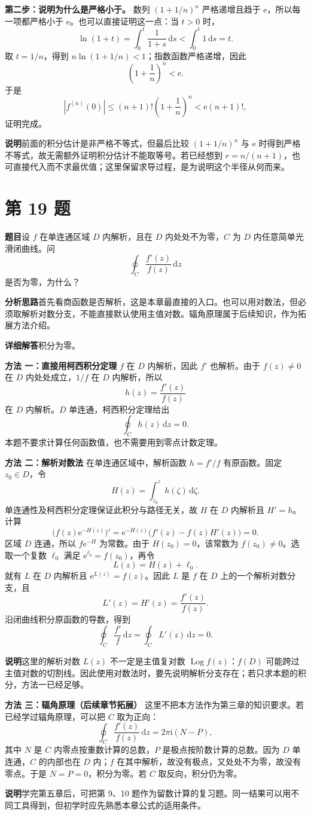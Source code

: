 \documentclass[UTF8,11pt,a4paper,fontset=fandol]{ctexart}
\newcommand{\ii}{\mathrm{i}}
\newcommand{\ee}{\mathrm{e}}
\newcommand{\dd}{\,\mathrm{d}}
\newcommand{\Log}{\operatorname{Log}}
\newcommand{\idea}{\par\medskip\Needspace{3\baselineskip}\noindent\textbf{分析思路}\quad}
\newcommand{\answer}{\par\medskip\Needspace{3\baselineskip}\noindent\textbf{详细解答}\quad}
\newcommand{\method}[1]{\par\medskip\Needspace{3\baselineskip}\noindent\textbf{方法 #1}\quad}
\newcommand{\note}{\par\medskip\Needspace{3\baselineskip}\noindent\textbf{说明}\quad}
\newcommand{\problem}[1]{\par\Needspace{8\baselineskip}\section*{第 #1 题}\addcontentsline{toc}{section}{第 #1 题}}
\begin{document}
\textbf{第二步：说明为什么是严格小于。}
数列 $(1+1/n)^n$ 严格递增且趋于 $\ee$，所以每一项都严格小于 $\ee$。也可以直接证明这一点：当 $t>0$ 时，
\[
\ln(1+t)=\int_0^t\frac1{1+s}\dd s<\int_0^t1\dd s=t.
\]
取 $t=1/n$，得到 $n\ln(1+1/n)<1$；指数函数严格递增，因此
\[
\left(1+\frac1n\right)^n<\ee.
\]
于是
\[
|f^{(n)}(0)|\leqslant(n+1)!\left(1+\frac1n\right)^n
<\ee(n+1)!,
\]
证明完成。
\note 前面的积分估计是非严格不等式，但最后比较 $(1+1/n)^n$ 与 $\ee$ 时得到严格不等式，故无需额外证明积分估计不能取等号。若已经想到 $r=n/(n+1)$，也可直接代入而不求最优值；这里保留求导过程，是为说明这个半径从何而来。

\problem{19}
\textbf{题目}\quad 设 $f$ 在单连通区域 $D$ 内解析，且在 $D$ 内处处不为零，$C$ 为 $D$ 内任意简单光滑闭曲线。问
\[
\oint_C\frac{f'(z)}{f(z)}\dd z
\]
是否为零，为什么？
\idea 首先看商函数是否解析，这是本章最直接的入口。也可以用对数法，但必须取解析对数分支，不能直接默认使用主值对数。辐角原理属于后续知识，作为拓展方法介绍。
\answer 积分为零。
\method{一：直接用柯西积分定理}
$f$ 在 $D$ 内解析，因此 $f'$ 也解析。由于 $f(z)\ne0$ 在 $D$ 内处处成立，$1/f$ 在 $D$ 内解析，所以
\[
h(z)=\frac{f'(z)}{f(z)}
\]
在 $D$ 内解析。$D$ 单连通，柯西积分定理给出
\[
\oint_C h(z)\dd z=0.
\]
本题不要求计算任何函数值，也不需要用到零点计数定理。

\method{二：解析对数法}
在单连通区域中，解析函数 $h=f'/f$ 有原函数。固定 $z_0\in D$，令
\[
H(z)=\int_{z_0}^z h(\zeta)\dd\zeta.
\]
单连通性及柯西积分定理保证此积分与路径无关，故 $H$ 在 $D$ 内解析且 $H'=h$。计算
\[
\big(f(z)\ee^{-H(z)}\big)'
=\ee^{-H(z)}\big(f'(z)-f(z)H'(z)\big)=0.
\]
区域 $D$ 连通，所以 $f\ee^{-H}$ 为常数。由于 $H(z_0)=0$，该常数为 $f(z_0)\ne0$。选取一个复数 $\ell_0$ 满足 $\ee^{\ell_0}=f(z_0)$，再令
\[
L(z)=H(z)+\ell_0.
\]
就有 $L$ 在 $D$ 内解析且 $\ee^{L(z)}=f(z)$。因此 $L$ 是 $f$ 在 $D$ 上的一个解析对数分支，且
\[
L'(z)=H'(z)=\frac{f'(z)}{f(z)}.
\]
沿闭曲线积分原函数的导数，得到
\[
\oint_C\frac{f'}{f}\dd z=\oint_C L'(z)\dd z=0.
\]
\note 这里的解析对数 $L(z)$ 不一定是主值复对数 $\Log f(z)$：$f(D)$ 可能跨过主值对数的切割线。因此使用对数法时，要先说明解析分支存在；若只求本题的积分，方法一已经足够。

\method{三：辐角原理（后续章节拓展）}
这里不把本方法作为第三章的知识要求。若已经学过辐角原理，可以把 $C$ 取为正向：
\[
\oint_C\frac{f'(z)}{f(z)}\dd z=2\pi\ii(N-P),
\]
其中 $N$ 是 $C$ 内零点按重数计算的总数，$P$ 是极点按阶数计算的总数。因为 $D$ 单连通，$C$ 的内部也在 $D$ 内；$f$ 在其中解析，故没有极点，又处处不为零，故没有零点。于是 $N=P=0$，积分为零。若 $C$ 取反向，积分仍为零。
\note 学完第五章后，可把第 9、10 题作为留数计算的复习题。同一结果可以用不同工具得到，但初学时应先熟悉本章公式的适用条件。
\end{document}
